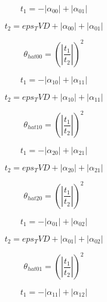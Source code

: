 \documentclass{article}
\begin{document}
\begin{dmath}t_{1} = - \left|{\alpha_{00}}\right| + \left|{\alpha_{01}}\right|\end{dmath}

\begin{dmath}t_{2} = eps_TVD + \left|{\alpha_{00}}\right| + \left|{\alpha_{01}}\right|\end{dmath}

\begin{dmath}\theta_{hat 00} = \left(\left|{\frac{t_{1}}{t_{2}}}\right| \right)^{2}\end{dmath}

\begin{dmath}t_{1} = - \left|{\alpha_{10}}\right| + \left|{\alpha_{11}}\right|\end{dmath}

\begin{dmath}t_{2} = eps_TVD + \left|{\alpha_{10}}\right| + \left|{\alpha_{11}}\right|\end{dmath}

\begin{dmath}\theta_{hat 10} = \left(\left|{\frac{t_{1}}{t_{2}}}\right| \right)^{2}\end{dmath}

\begin{dmath}t_{1} = - \left|{\alpha_{20}}\right| + \left|{\alpha_{21}}\right|\end{dmath}

\begin{dmath}t_{2} = eps_TVD + \left|{\alpha_{20}}\right| + \left|{\alpha_{21}}\right|\end{dmath}

\begin{dmath}\theta_{hat 20} = \left(\left|{\frac{t_{1}}{t_{2}}}\right| \right)^{2}\end{dmath}

\begin{dmath}t_{1} = - \left|{\alpha_{01}}\right| + \left|{\alpha_{02}}\right|\end{dmath}

\begin{dmath}t_{2} = eps_TVD + \left|{\alpha_{01}}\right| + \left|{\alpha_{02}}\right|\end{dmath}

\begin{dmath}\theta_{hat 01} = \left(\left|{\frac{t_{1}}{t_{2}}}\right| \right)^{2}\end{dmath}

\begin{dmath}t_{1} = - \left|{\alpha_{11}}\right| + \left|{\alpha_{12}}\right|\end{dmath}
\end{document}

